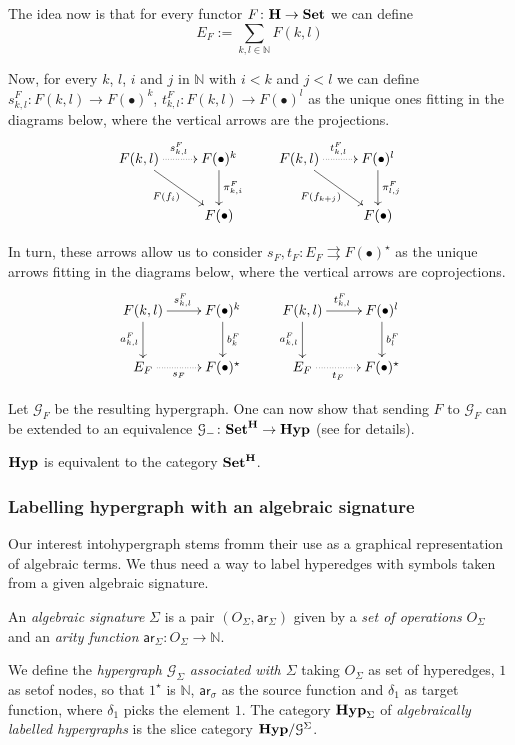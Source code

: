 \documentclass[runningheads,envcountsect]{lipics-v2021}
\newcommand{\Set}{\mathbf{Set}}
\newcommand{\catname}[1]{\textbf{\textup{#1}}}
\newcommand{\hyp}{\catname{Hyp}}
\newcommand{\hyps}{\catname{Hyp}_{\Sigma}}
\newcommand{\ari}{\mathsf{ar}}
\begin{document}
The idea now is that for every functor $F\colon \catname{H}\to \catname{Set}$ we can define
\[E_F:=\sum_{k,l\in \mathbb{N}}F(k,l)\]

Now, for every $k$, $l$, $i$ and $j$ in $\mathbb{N}$ with $i< k$ and $j< l$ we can define $s^F_{k,l}\colon F(k,l)\to F(\bullet)^k$,  $t^F_{k,l}\colon F(k,l)\to F(\bullet)^l$ as the unique ones fitting in the diagrams below, where the vertical arrows are the projections.
\[\xymatrix{F(k,l)  \ar@{.>}[r]^{s^F_{k,l}} \ar[dr]_{F(f_i)}& F(\bullet)^{k} \ar[d]^{\pi^F_{k,i}} & F(k,l) \ar@{.>}[r]^{t^F_{k,l}} \ar[dr]_{F(f_{k+j})} & F(\bullet)^{l} \ar[d]^{\pi^F_{l,j}} \\ & F(\bullet) && F(\bullet)}\]

In turn, these arrows allow us to consider
$s_F, t_F\colon E_F\rightrightarrows F(\bullet)^{\star}$ as the unique arrows fitting in the diagrams below, where the vertical arrows are coprojections.
\[\xymatrix{F(k,l) \ar[d]_{a^F_{k,l}}  \ar[r]^{s^{F}_{k,l}}& F(\bullet)^{k} \ar[d]^{b^F_{k}} & F(k,l) \ar[d]_{a^F_{k,l}}  \ar[r]^{t^{F}_{k,l}}& F(\bullet)^{l} \ar[d]^{b^F_{l}}\\ E_F \ar@{.>}[r]_-{s_F}& F(\bullet)^\star & E_F \ar@{.>}[r]_-{t_F}& F(\bullet)^\star}\]

Let $\mathcal{G}_F$ be the resulting hypergraph. One can now show that  sending $F$ to $\mathcal{G}_F$ can be extended to an equivalence $\mathcal{G}_{-}\colon \Set^{\catname{H}}\to \hyp$ (see \cite{castelnovo2023thesis, castelnovo2022newcriterionmathcalmmathcalnadhesivity} for details).


\begin{proposition}
	$\hyp$ is equivalent to the category $\Set^{\catname{H}}$.
\end{proposition}

\subsubsection{Labelling hypergraph with an algebraic signature}

Our interest intohypergraph stems fromm their use as a graphical representation of algebraic terms. We thus need a way to label hyperedges with symbols taken from a given algebraic signature.

\begin{definition}
An \emph{algebraic signature} $\Sigma$ is a pair $(O_\Sigma, \ari_\Sigma)$ given by a \emph{set of operations} $O_\Sigma$ and an \emph{arity function} $\ari_\Sigma\colon O_\Sigma \to \mathbb{N}$. 

We define the \emph{hypergraph $\mathcal{G}_\Sigma$ associated with $\Sigma$} taking $O_\Sigma$ as set of hyperedges, $1$ as setof nodes, so that $1^\star$ is $\mathbb{N}$, $\ari_\sigma$ as the source function and $\delta_1$ as target function, where $\delta_1$ picks the element $1$. The category $\hyps$ of \emph{algebraically labelled hypergraphs} is the slice category $\hyp/\mathcal{G}^\Sigma$.
\end{definition}
\end{document}
